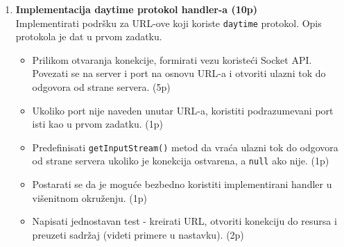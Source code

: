 \documentclass[]{article}
\begin{document}
\begin{enumerate}
\begin{tabular}{lll}
\begin{lstlisting}
  \end{lstlisting}\\
  \begin{lstlisting}
  \end{lstlisting}&
  \begin{lstlisting}   
  [end]
  \end{lstlisting}&
  \begin{lstlisting}
  Client disconnected
  \end{lstlisting}
  \end{tabular}
\begin{center}
  \vspace{20pt}
  \textbf{------------------------------------------------------------------------------------------------------------------------------}
\end{center}
\vspace{10pt}
\textit{Napomena: Ohrabrujemo studente da koriste \texttt{netcat} kako bi testirali delimi\v{c}ne implementacije i otkrili gre\v{s}ke pre vremena. Takodje, ukoliko se npr. presko\v{c}i implementacija servera, mo\v{z}e se mock-ovati server putem \texttt{netcat}-a.} 
\begin{center}
  \vspace{10pt}
  \textbf{--------------------------------------------------- Okrenite stranu! ---------------------------------------------------}
\end{center}
\newpage
  \item \textbf{Implementacija daytime protokol handler-a (10p)}
  \\Implementirati podr\v{s}ku za URL-ove koji koriste \texttt{daytime} protokol. Opis protokola je dat u prvom zadatku. 
  \begin{itemize}
    \item Prilikom otvaranja konekcije, formirati vezu koriste\'c{}i Socket API. Povezati se na server i port na osnovu URL-a i otvoriti ulazni tok do odgovora od strane servera. \hfill (5p)
    \item Ukoliko port nije naveden unutar URL-a, koristiti podrazumevani port isti kao u prvom zadatku. \hfill (1p)
    \item Predefinisati \texttt{getInputStream()} metod da vra\'c{}a ulazni tok do odgovora od strane servera ukoliko je konekcija ostvarena, a \texttt{null} ako nije. \hfill (1p)
    \item Postarati se da je mogu\'c{}e bezbedno koristiti implementirani handler u vi\v{s}enitnom okru\v{z}enju. \hfill (1p)
    \item Napisati jednostavan test - kreirati URL, otvoriti konekciju do resursa i preuzeti sadr\v{z}aj (videti primere u nastavku). \hfill (2p)
  \end{itemize}
  

\end{enumerate}
\end{document}
